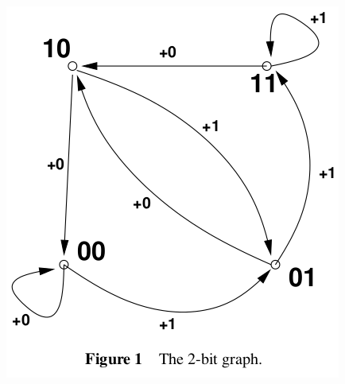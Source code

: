 \documentclass[14pt]{extarticle}
\begin{document}
\begin{figure}[ht!]
\centering
\includegraphics[scale=0.5]{2-bit-graph.png}
\end{figure}
\end{document}

